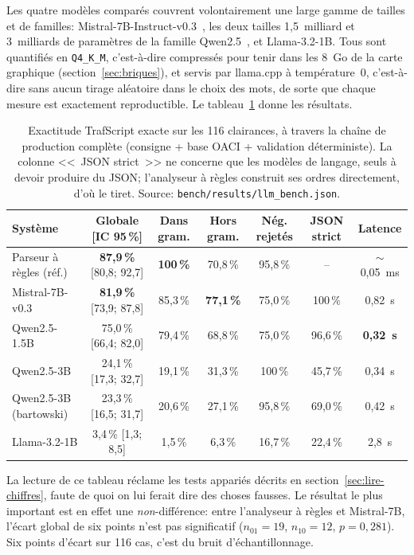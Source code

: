 \documentclass[11pt,a4paper]{article}
\begin{document}
Les quatre modèles comparés couvrent volontairement une large gamme de tailles et de familles: Mistral-7B-Instruct-v0.3~\cite{mistral}, les deux tailles 1,5~milliard et 3~milliards de paramètres de la famille Qwen2.5~\cite{qwen}, et Llama-3.2-1B. Tous sont quantifiés en \texttt{Q4\_K\_M}, c'est-à-dire compressés pour tenir dans les 8~Go de la carte graphique (section~\ref{sec:briques}), et servis par llama.cpp à température~0, c'est-à-dire sans aucun tirage aléatoire dans le choix des mots, de sorte que chaque mesure est exactement reproductible. Le tableau~\ref{tab:llm} donne les résultats. 

\begin{table}[!htbp]
\centering
\caption[Exactitude TrafScript exacte sur les 116 clairances]{Exactitude TrafScript exacte sur les 116 clairances, à travers la chaîne de
production complète (consigne + base OACI + validation déterministe). La colonne <<~JSON
strict~>> ne concerne que les modèles de langage, seuls à devoir produire du JSON;
l'analyseur à règles construit ses ordres directement, d'où le tiret. Source:
\texttt{bench/results/llm\_bench.json}.}
\label{tab:llm}
\scriptsize
\setlength{\tabcolsep}{3pt}
\begin{tabular}{l c c c c c c}
\toprule
\rowcolor{lightgray}\textbf{Système} & \textbf{Globale [IC 95\,\%]} & \textbf{Dans gram.} & \textbf{Hors gram.} & \textbf{Nég. rejetés} & \textbf{JSON strict} & \textbf{Latence}\\
\midrule
Parseur à règles (réf.) & \textbf{87,9\,\%} [80,8; 92,7] & \textbf{100\,\%} & 70,8\,\% & 95,8\,\% & -- & $\sim$0,05~ms\\
Mistral-7B-v0.3 & \textbf{81,9\,\%} [73,9; 87,8] & 85,3\,\% & \textbf{77,1\,\%} & 75,0\,\% & 100\,\% & 0,82~s\\
Qwen2.5-1.5B & 75,0\,\% [66,4; 82,0] & 79,4\,\% & 68,8\,\% & 75,0\,\% & 96,6\,\% & \textbf{0,32~s}\\
Qwen2.5-3B & 24,1\,\% [17,3; 32,7] & 19,1\,\% & 31,3\,\% & 100\,\% & 45,7\,\% & 0,34~s\\
Qwen2.5-3B (bartowski) & 23,3\,\% [16,5; 31,7] & 20,6\,\% & 27,1\,\% & 95,8\,\% & 69,0\,\% & 0,42~s\\
Llama-3.2-1B & 3,4\,\% [1,3; 8,5] & 1,5\,\% & 6,3\,\% & 16,7\,\% & 22,4\,\% & 2,8~s\\
\bottomrule
\end{tabular}
\end{table}

La lecture de ce tableau réclame les tests appariés décrits en section~\ref{sec:lire-chiffres}, faute de quoi on lui ferait dire des choses fausses. Le résultat le plus important est en effet une \emph{non}-différence: entre l'analyseur à règles et Mistral-7B, l'écart global de six points n'est pas significatif ($n_{01} = 19$, $n_{10} = 12$, $p = 0{,}281$). Six points d'écart sur 116 cas, c'est du bruit d'échantillonnage.
\end{document}
